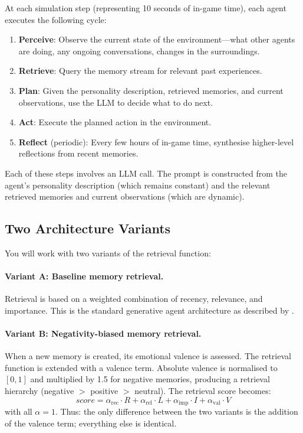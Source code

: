 At each simulation step (representing 10 seconds of in-game time), each agent executes the following cycle:
\begin{enumerate}
    \item \textbf{Perceive}: Observe the current state of the environment---what other agents are doing, any ongoing conversations, changes in the surroundings.
    \item \textbf{Retrieve}: Query the memory stream for relevant past experiences.
    \item \textbf{Plan}: Given the personality description, retrieved memories, and current observations, use the LLM to decide what to do next.
    \item \textbf{Act}: Execute the planned action in the environment.
    \item \textbf{Reflect} (periodic): Every few hours of in-game time, synthesise higher-level reflections from recent memories.
\end{enumerate}

Each of these steps involves an LLM call. The prompt is constructed from the agent's personality description (which remains constant) and the relevant retrieved memories and current observations (which are dynamic).

\subsection{Two Architecture Variants}

You will work with two variants of the retrieval function:

\paragraph{Variant A: Baseline memory retrieval.}
Retrieval is based on a weighted combination of recency, relevance, and importance. This is the standard generative agent architecture as described by \citet{park2023generative}.

\paragraph{Variant B: Negativity-biased memory retrieval.}
When a new memory is created, its emotional valence is assessed. The retrieval function is extended with a valence term. Absolute valence is normalised to $[0, 1]$ and multiplied by 1.5 for negative memories, producing a retrieval hierarchy (negative $>$ positive $>$ neutral). The retrieval score becomes:
\begin{equation}\label{eq:retrieval-never}
    \textit{score} = \alpha_{\text{rec}} \cdot R + \alpha_{\text{rel}} \cdot L + \alpha_{\text{imp}} \cdot I + \alpha_{\text{val}} \cdot V
\end{equation}
with all $\alpha = 1$. Thus: the only difference between the two variants is the addition of the valence term; everything else is identical.

